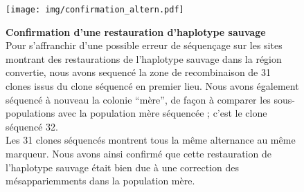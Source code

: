 \begin{figure}[ht]
  \centering
  \texttt{[image: img/confirmation\_altern.pdf]}
  \caption[Confirmation des restaurations]{\label{fig:confirm-haplotype}
    \textbf{Confirmation d'une restauration d'haplotype sauvage} \\
    \rmfamily Pour s'affranchir d'une possible erreur de séquençage sur les
    sites montrant des restaurations de l'haplotype sauvage dans la région convertie, nous avons
    sequencé la zone de recombinaison de 31 clones issus du clone séquencé en
    premier lieu. Nous avons également séquencé à nouveau la colonie ``mère'',
    de façon à comparer les sous-populations avec la population mère séquencée ;
    c'est le clone séquencé \num{32}.
    \\
    Les 31 clones séquencés montrent tous la même alternance au même marqueur.
    Nous avons ainsi confirmé que cette restauration de l'haplotype sauvage
    était bien due à une correction des mésappariemments dans la population
    mère.
  }
\end{figure}


